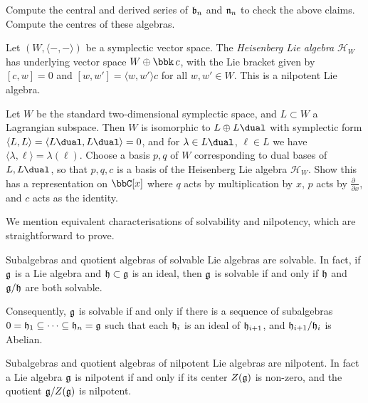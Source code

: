 \begin{exercise}
    Compute the central and derived series of $\mathfrak{b}_n$ and $\mathfrak{n}_n$ to check the
    above claims. Compute the centres of these algebras.
\end{exercise}

\begin{example}
    Let $(W, \langle -, -\rangle)$ be a symplectic vector space. The
    \emph{Heisenberg Lie algebra} $\mathcal{H}_W$ has underlying vector space
    $W\oplus \bbk \, c$, with the Lie bracket given by \([c,w]=0\) and
    $[w,w']=\langle w, w'\rangle c$ for all $w,w'\in W$. This is a nilpotent Lie
    algebra.
\end{example}

\begin{exercise}
    Let $W$ be the standard two-dimensional symplectic space, and
    $L\subset W$ a Lagrangian subspace. Then $W$ is isomorphic to $L\oplus
    L\dual$ with symplectic form $\langle L, L\rangle = \langle L\dual,
    L\dual\rangle = 0$, and for $\lambda \in L\dual$, $\ell \in
    L$ we have $\langle \lambda , \ell\rangle = \lambda(\ell)$. Choose a basis
    $p,q$ of $W$ corresponding to dual bases of $L,L\dual$, so that $p,q,c$ is a
    basis of the Heisenberg Lie algebra $\mathcal{H}_W$. Show this has a
    representation on $\bbC[x]$ where $q$ acts by multiplication by $x$, $p$
    acts by $\frac{\partial\phantom{x}}{\partial x}$, and $c$ acts as the identity.
\end{exercise}

We mention equivalent characterisations of solvability and nilpotency, which are
straightforward to prove.

\begin{proposition}
    Subalgebras and quotient algebras of solvable Lie algebras are
    solvable. In fact, if $\mathfrak{g}$ is a Lie algebra and
    $\mathfrak{h}\subset \mathfrak{g}$ is an ideal, then $\mathfrak{g}$ is solvable if and
    only if $\mathfrak{h}$ and $\mathfrak{g}/\mathfrak{h}$ are both solvable. 

    Consequently, $\mathfrak{g}$ is solvable if and only if there is a sequence of
    subalgebras $0=\mathfrak{h}_1\subseteq \cdots\subseteq \mathfrak{h}_n=\mathfrak{g}$ such that
    each $\mathfrak{h}_i$ is an ideal of $\mathfrak{h}_{i+1}$, and $\mathfrak{h}_{i+1}/\mathfrak{h}_i$
    is Abelian.
\end{proposition}

\begin{proposition}
Subalgebras and quotient algebras of nilpotent Lie algebras are nilpotent. In
fact a Lie algebra $\mathfrak{g}$ is nilpotent if and only if its center $Z(\mathfrak{g})$
is non-zero, and the quotient $\mathfrak{g}/Z(\mathfrak{g})$ is nilpotent.
\end{proposition}


